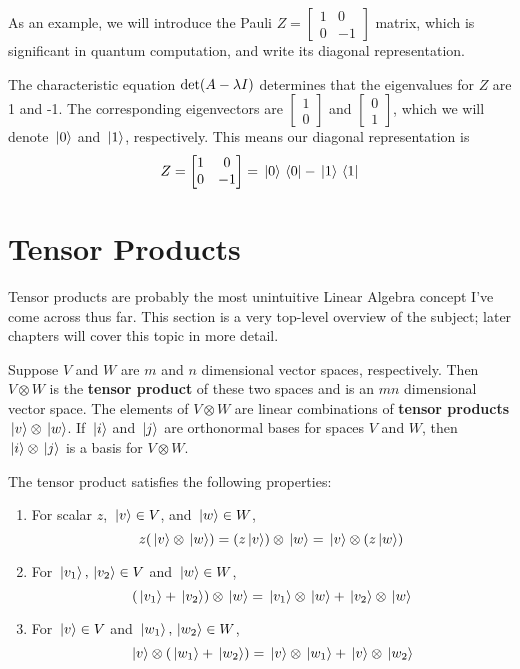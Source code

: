As an example, we will introduce the Pauli $Z = \begin{bmatrix}
1 & 0 \\
0 & -1
\end{bmatrix}$ matrix, which is significant in quantum computation, and write its diagonal representation.  

The characteristic equation $\operatorname{det}(A - \lambda I)$ determines that the eigenvalues for $Z$ are 1 and -1. The corresponding eigenvectors are $\begin{bmatrix}
1 \\ 0
\end{bmatrix}$ and $\begin{bmatrix}
0 \\ 1
\end{bmatrix}$, which we will denote $\ket*{0}$ and $\ket*{1}$, respectively. This means our diagonal representation is 
$$Z = \begin{bmatrix}
1 & 0 \\
0 & -1
\end{bmatrix} = \ket*{0}\bra*{0} - \ket*{1}\bra*{1}$$

\section{Tensor Products}

Tensor products are probably the most unintuitive Linear Algebra concept I've come across thus far. This section is a very top-level overview of the subject; later chapters will cover this topic in more detail. 

\begin{definition}
Suppose $V$ and $W$ are $m$ and $n$ dimensional vector spaces, respectively. Then $V \otimes W$ is the \textbf{tensor product} of these two spaces and is an $mn$ dimensional vector space. The elements of $V \otimes W$ are linear combinations of \textbf{tensor products} $\ket*{v} \otimes \ket*{w}$. If $\ket*{i}$ and $\ket*{j}$ are orthonormal bases for spaces $V$ and $W$, then $\ket*{i} \otimes \ket*{j}$ is a basis for $V \otimes W$. 
\end{definition}

The tensor product satisfies the following properties: 
\begin{enumerate}
	\item For scalar $z$, $\ket*{v} \in V$, and $\ket*{w} \in W$, $$z (\ket*{v} \otimes \ket*{w}) = (z\ket*{v}) \otimes \ket*{w} = \ket*{v} \otimes (z\ket*{w})$$
	\item For $\ket*{v_{1}}, \ket*{v_{2}} \in V$ and $\ket*{w} \in W$, $$(\ket*{v_{1}} + \ket*{v_{2}}) \otimes \ket*{w} = \ket*{v_{1}} \otimes \ket*{w} + \ket*{v_{2}} \otimes \ket*{w}$$
	\item For $\ket*{v} \in V$ and $\ket*{w_{1}}, \ket*{w_{2}} \in W$, $$\ket*{v} \otimes (\ket*{w_{1}} + \ket*{w_{2}}) = \ket*{v} \otimes \ket*{w_{1}} + \ket*{v} \otimes \ket*{w_{2}}$$
\end{enumerate}

